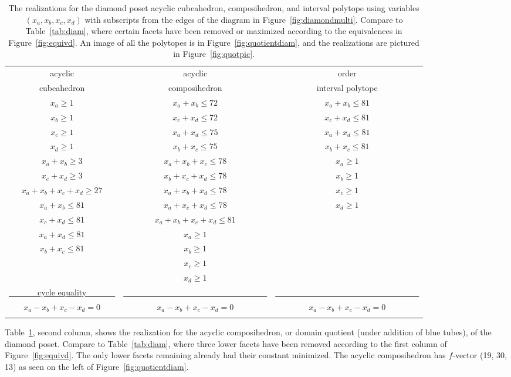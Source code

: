 \documentclass{article}
\begin{document}
\begin{table}[h!]
    \centering
    \begin{tabular}{| c | c | c |}
\hline
acyclic & acyclic & order \\
 cubeahedron & composihedron &  interval polytope \\ \hline
    $x_a \ge 1$  &  $x_a+x_b \le 72$  &  $x_a+x_b \le 81$ \\
 $x_b \ge 1$   &  $x_c+x_d \le 72$  &  $x_c+x_d \le 81$ \\
  $x_c \ge 1$ &   $x_a+x_d \le 75$  &  $x_a+x_d \le 81$ \\
   $x_d \ge 1$    &    $x_b+x_c \le 75$  &  $x_b+x_c \le 81$ \\
   $x_a+x_b \ge 3$    &  $x_a+x_b+x_c \le 78$ &  $x_a \ge 1$ \\
   $x_c+x_d \ge 3$  &   $x_b+x_c+x_d \le 78$  & $x_b \ge 1$  \\
$x_a+x_b+x_c+x_d \ge 27$  & $x_a+x_b+x_d \le 78$ & $x_c \ge 1$ \\ 
 $x_a+x_b \le 81$   & $x_a+x_c+x_d \le 78$ & $x_d \ge 1$ \\
$x_c+x_d \le 81$  &  $x_a+x_b+x_c+x_d \le 81$ &  \\
 $x_a+x_d \le 81$  & $x_a \ge 1$ & \\
  $x_b+x_c \le 81$  &  $x_b \ge 1$ & \\
  & $x_c \ge 1$ & \\
  & $x_d \ge 1$ & \\
\underline{~~~~~~~cycle equality~~~~~~~} &\underline{~~~~~~~~~~~~~~~~~~~~~~~~~~~~~~~~~~~}  & \underline{~~~~~~~~~~~~~~~~~~~~~~~~~~~~~~~~~~~} \\ 
$x_a-x_b+x_c-x_d = 0$ &$x_a-x_b+x_c-x_d = 0$& $x_a-x_b+x_c-x_d = 0$\\
&& \\
\hline
\end{tabular}
    \caption{The realizations for the diamond poset acyclic cubeahedron, composihedron, and interval polytope using variables $(x_a,x_b,x_c,x_d)$ with subscripts from the edges of the diagram in Figure~\ref{fig:diamondmulti}. Compare to Table~\ref{tab:diam}, where certain facets have been removed or maximized according to the equivalences in Figure~\ref{fig:equivd}. An image of all the polytopes is in Figure~\ref{fig:quotientdiam}, and the realizations are pictured in Figure~\ref{fig:quotpic}.}
    \label{tab:quot}
\end{table}


Table~\ref{tab:quot}, second column, shows the realization  
 for the acyclic composihedron, or domain quotient (under addition of blue tubes), of the diamond poset. Compare to Table~\ref{tab:diam}, where three lower facets have been removed according to the first column of Figure~\ref{fig:equivd}. The only lower facets remaining already had their constant minimized. The acyclic composihedron has $f$-vector (19, 30, 13) as seen on the left of Figure~\ref{fig:quotientdiam}.
\end{document}
